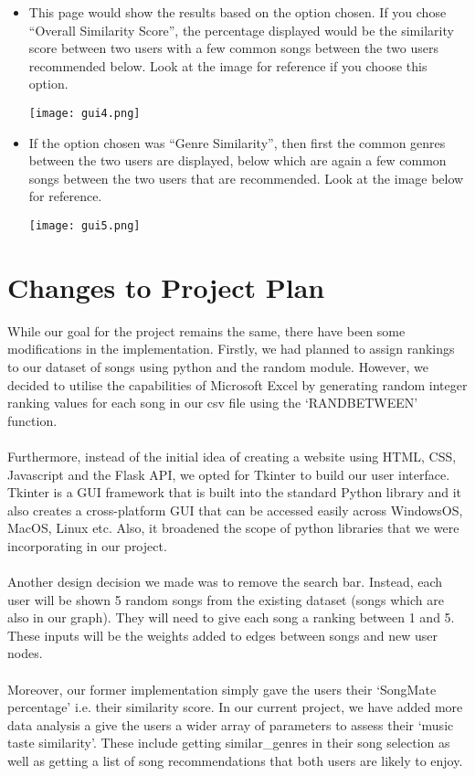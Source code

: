 \documentclass[fontsize=11pt]{article}
\begin{document}
\begin{itemize}
    \item This page would show the results based on the option chosen. If you chose “Overall Similarity Score”, the percentage displayed would be the similarity score between two users with a few common songs between the two users recommended below. Look at the image for reference if you choose this option.
    
    \centering
    \texttt{[image: gui4.png]}
    \label{fig:GUI}
    
    \item If the option chosen was “Genre Similarity”, then first the common genres between the two users are displayed, below which are again a few common songs between the two users that are recommended. Look at the image below for reference.
    
    \centering
    \texttt{[image: gui5.png]}
    \label{fig:GUI}

\end{itemize}




\section*{Changes to Project Plan}

While our goal for the project remains the same, there have been some modifications in the implementation. Firstly, we had planned to assign rankings to our dataset of songs using python and the random module. However, we decided to utilise the capabilities of Microsoft Excel by generating random integer ranking values for each song in our csv file using the ‘RANDBETWEEN’ function. 
\\\\
Furthermore, instead of the initial idea of creating a website using HTML, CSS, Javascript and the Flask API, we opted for Tkinter to build our user interface. Tkinter is a GUI framework that is built into the standard Python library and it also creates a cross-platform GUI that can be accessed easily across WindowsOS, MacOS, Linux etc. Also, it broadened the scope of python libraries that we were incorporating in our project. 
\\\\
Another design decision we made was to remove the search bar. Instead, each user will be shown 5 random songs from the existing dataset (songs which are also in our graph). They will need to give each song a ranking between 1 and 5. These inputs will be the weights added to edges between songs and new user nodes. 
\\\\
Moreover, our former implementation simply gave the users their ‘SongMate percentage’ i.e. their similarity score. In our current project, we have added more data analysis a give the users a wider array of parameters to assess their ‘music taste similarity’. These include getting similar\_genres in their song selection as well as getting a list of song recommendations that both users are likely to enjoy. 
\end{document}
